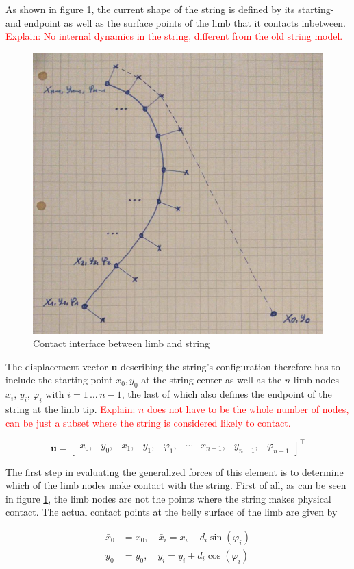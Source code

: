 As shown in figure \ref{fig:elements:string-element}, the current shape of the string is defined by its starting- and endpoint as well as the surface points of the limb that it contacts inbetween.
\textcolor{red}{Explain: No internal dynamics in the string, different from the old string model.}

\begin{figure}[h]
\centering
\includegraphics[width=0.5\linewidth]{figures/elements/string-element-new.jpg}
\caption{Contact interface between limb and string}
\label{fig:elements:string-element}
\end{figure}

The displacement vector $\boldsymbol{u}$ describing the string's configuration therefore has to include the starting point $x_{0}, y_{0}$ at the string center as well as the $n$ limb nodes $x_{i},\,y_{i},\,\varphi_{i}$ with $i = 1\,\ldots\,n-1$, the last of which also defines the endpoint of the string at the limb tip.
\textcolor{red}{Explain: $n$ does not have to be the whole number of nodes, can be just a subset where the string is considered likely to contact.}

\begin{equation}
\boldsymbol{u} = \begin{bmatrix}
x_{0}, & y_{0}, & x_{1}, & y_{1}, & \varphi_{1}, & \cdots & x_{n-1}, & y_{n-1}, & \varphi_{n-1}
\end{bmatrix}^\intercal
\end{equation}

The first step in evaluating the generalized forces of this element is to determine which of the limb nodes make contact with the string.
First of all, as can be seen in figure \ref{fig:elements:string-element}, the limb nodes are not the points where the string makes physical contact.
The actual contact points at the belly surface of the limb are given by

\begin{align}
\bar{x}_{0} &= x_{0}, \quad \bar{x}_{i} = x_{i} - d_{i}\sin(\varphi_{i}) \\
\bar{y}_{0} &= y_{0}, \quad \bar{y}_{i} = y_{i} + d_{i}\cos(\varphi_{i})
\end{align}


